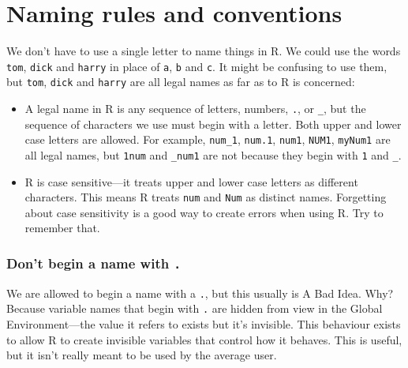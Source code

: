 \documentclass[
]{book}
\newenvironment{greybox}{
  \definecolor{shadecolor}{rgb}{0.95,0.95,0.95}  %
  \color{black}
  \begin{shaded}}
 {\end{shaded}}
\newenvironment{infobox}[1]
  {
  \begin{itemize}
  \renewcommand{\labelitemi}{
    \raisebox{-.7\height}[0pt][0pt]{
      {\setkeys{Gin}{width=3em,keepaspectratio}
        \texttt{[image: images/\#1]}}
    }
  }
  \setlength{\fboxsep}{1em}
  \begin{greybox}
  \item
  }
  {
  \end{greybox}
  \end{itemize}
  }
\begin{document}
\hypertarget{naming-rules-and-conventions}{%
\section{Naming rules and conventions}\label{naming-rules-and-conventions}}

We don't have to use a single letter to name things in R. We could use the words \texttt{tom}, \texttt{dick} and \texttt{harry} in place of \texttt{a}, \texttt{b} and \texttt{c}. It might be confusing to use them, but \texttt{tom}, \texttt{dick} and \texttt{harry} are all legal names as far as to R is concerned:

\begin{itemize}
\item
  A legal name in R is any sequence of letters, numbers, \texttt{.}, or \texttt{\_}, but the sequence of characters we use must begin with a letter. Both upper and lower case letters are allowed. For example, \texttt{num\_1}, \texttt{num.1}, \texttt{num1}, \texttt{NUM1}, \texttt{myNum1} are all legal names, but \texttt{1num} and \texttt{\_num1} are not because they begin with \texttt{1} and \texttt{\_}.
\item
  R is case sensitive---it treats upper and lower case letters as different characters. This means R treats \texttt{num} and \texttt{Num} as distinct names. Forgetting about case sensitivity is a good way to create errors when using R. Try to remember that.
\end{itemize}

\begin{infobox}{warning}

\hypertarget{dont-begin-a-name-with-.}{%
\subsubsection*{\texorpdfstring{Don't begin a name with \texttt{.}}{Don't begin a name with .}}\label{dont-begin-a-name-with-.}}

We are allowed to begin a name with a \texttt{.}, but this usually is A Bad Idea. Why? Because variable names that begin with \texttt{.} are hidden from view in the Global Environment---the value it refers to exists but it's invisible. This behaviour exists to allow R to create invisible variables that control how it behaves. This is useful, but it isn't really meant to be used by the average user.

\end{infobox}
\end{document}
